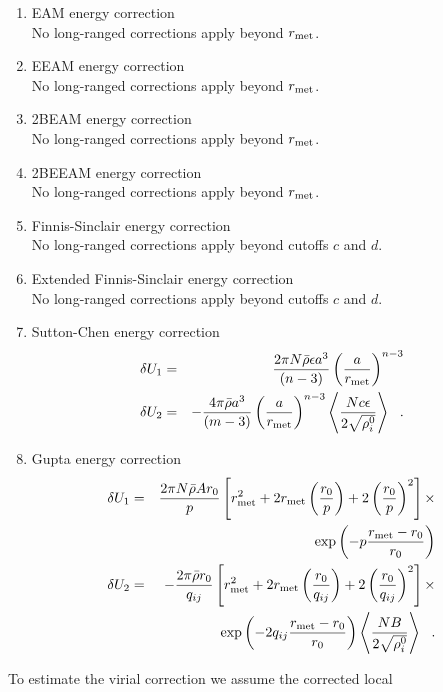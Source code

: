 \begin{enumerate}
\item EAM energy correction \\
No long-ranged corrections apply beyond $r_{\rm met}$.
\item EEAM energy correction \\
No long-ranged corrections apply beyond $r_{\rm met}$.
\item 2BEAM energy correction \\
No long-ranged corrections apply beyond $r_{\rm met}$.
\item 2BEEAM energy correction \\
No long-ranged corrections apply beyond $r_{\rm met}$.
\item Finnis-Sinclair energy correction \\
No long-ranged corrections apply beyond cutoffs $c$ and $d$.
\item Extended Finnis-Sinclair energy correction \\
No long-ranged corrections apply beyond cutoffs $c$ and $d$.
\item Sutton-Chen energy correction
\begin{eqnarray}
\delta U_{1} &=& \frac{2 \pi N \bar{\rho} \epsilon a^{3}}{(n-3)}
\left( \frac{a}{r_{\rm met}} \right)^{n-3} \nonumber \\
\delta U_{2} &=& -\frac{4 \pi \bar{\rho} a^{3}}{(m-3)} \left( \frac{a}{r_{\rm met}} \right)^{n-3}
\left< \frac{N c \epsilon}{2\sqrt{\rho_{i}^{0}}} \right>~~.
\end{eqnarray}
\item Gupta energy correction
\begin{eqnarray}
\delta U_{1} &=& \frac{2 \pi N \bar{\rho} A r_{0}}{p}
\left[ r_{\rm met}^{2} + 2 r_{\rm met} \left(\frac{r_{0}}{p}\right) +
2 \left(\frac{r_{0}}{p}\right)^{2} \right] \times \nonumber \\
& & \exp \left( -p \frac{r_{\rm met}-r_{0}}{r_{0}}\right) \nonumber \\
\delta U_{2} &=& -\frac{2 \pi \bar{\rho} r_{0}}{q_{ij}}
\left[ r_{\rm met}^{2} + 2 r_{\rm met} \left(\frac{r_{0}}{q_{ij}}\right) +
2 \left(\frac{r_{0}}{q_{ij}}\right)^{2} \right] \times \\
& & \exp \left( -2 q_{ij} \frac{r_{\rm met}-r_{0}}{r_{0}}\right)
\left< \frac{N B}{2\sqrt{\rho_{i}^{0}}} \right>~~. \nonumber
\end{eqnarray}
\end{enumerate}
To estimate the virial correction we assume the corrected local
